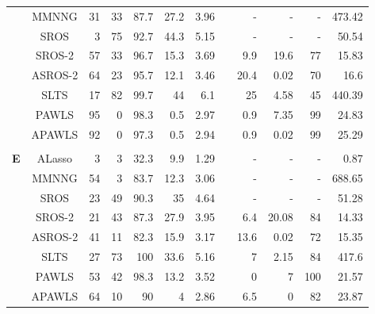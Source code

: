 \documentclass{article}\usepackage[]{graphicx}\usepackage[]{color}
\begin{document}
\begin{table}[thp]
\begin{center}
\begin{tabular}{ccrrrrrrrrrr}
	      & MMNNG & 31 & 33 & 87.7 
	      & 27.2 & 3.96 & & -& - & - & 473.42\\
	      
	      & SROS & 3 & 75 & 92.7 
	      & 44.3 & 5.15 & & -& - & - &  50.54\\
	      
	       & SROS-2 & 57 & 33 & 96.7 
	      & 15.3 & 3.69 & & 9.9 
	      & 19.6 & 77 & 15.83\\
	      
	      & ASROS-2 & 64 & 23 & 95.7 
	      & 12.1 & 3.46 & & 20.4 
	      & 0.02 & 70 & 16.6\\
	      
	      
	       & SLTS & 17 & 82 & 99.7 
	      & 44 & 6.1 & & 25 
	      & 4.58 & 45 & 440.39\\
	      
	      & PAWLS & 95 & 0 & 98.3 
	      & 0.5 & 2.97 & & 0.9 
	      & 7.35 & 99 & 24.83\\
	      
	      & APAWLS & 92 & 0 & 97.3 
	      & 0.5 & 2.94 & & 0.9 
	      & 0.02 & 99 & 25.29\\
	      
	      \\
	       	  \multirow{8}{*}{{\bf E}}
	      & ALasso & 3 & 3 & 32.3 
	      & 9.9 & 1.29 & & -& - & - &  0.87\\
	      
	      & MMNNG & 54 & 3 & 83.7 
	      & 12.3 & 3.06 & & -& - & - & 688.65\\
	      
	      & SROS & 23 & 49 & 90.3 
	      & 35 & 4.64 & & -& - & - &  51.28\\
	      
	       & SROS-2 & 21 & 43 & 87.3 
	      & 27.9 & 3.95 & & 6.4 
	      & 20.08 & 84 & 14.33\\
	      
	      & ASROS-2 & 41 & 11 & 82.3 
	      & 15.9 & 3.17 & & 13.6 
	      & 0.02 & 72 & 15.35\\
	      
	      
	       & SLTS & 27 & 73 & 100 
	      & 33.6 & 5.16 & & 7 
	      & 2.15 & 84 & 417.6\\
	      
	      & PAWLS & 53 & 42 & 98.3 
	      & 13.2 & 3.52 & & 0 
	      & 7 & 100 & 21.57\\
	      
	      & APAWLS & 64 & 10 & 90 
	      & 4 & 2.86 & & 6.5 
	      & 0 & 82 & 23.87\\
	      
	   \hline\hline
	
	\end{tabular}
	\end{center}
	\end{table}
	
\end{document}
